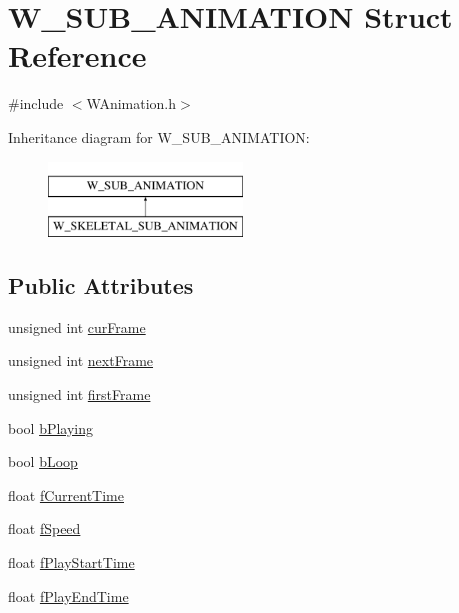 \hypertarget{struct_w___s_u_b___a_n_i_m_a_t_i_o_n}{}\section{W\+\_\+\+S\+U\+B\+\_\+\+A\+N\+I\+M\+A\+T\+I\+ON Struct Reference}
\label{struct_w___s_u_b___a_n_i_m_a_t_i_o_n}


{\ttfamily \#include $<$W\+Animation.\+h$>$}

Inheritance diagram for W\+\_\+\+S\+U\+B\+\_\+\+A\+N\+I\+M\+A\+T\+I\+ON\+:\begin{figure}[H]
\begin{center}
\leavevmode
\includegraphics[height=2.000000cm]{struct_w___s_u_b___a_n_i_m_a_t_i_o_n}
\end{center}
\end{figure}
\subsection*{Public Attributes}
\begin{DoxyCompactItemize}
\item 
unsigned int \hyperlink{struct_w___s_u_b___a_n_i_m_a_t_i_o_n_a6eaba4aaaf7dad81d0259fdfb5b0ee84}{cur\+Frame}
\item 
unsigned int \hyperlink{struct_w___s_u_b___a_n_i_m_a_t_i_o_n_a4c308bafa17ea951fcf4486caf9f45b8}{next\+Frame}
\item 
unsigned int \hyperlink{struct_w___s_u_b___a_n_i_m_a_t_i_o_n_a32f726d022afd30cff9b7cae9259cafa}{first\+Frame}
\item 
bool \hyperlink{struct_w___s_u_b___a_n_i_m_a_t_i_o_n_a8cf7c188213a51cd0bf3a2bb18add32b}{b\+Playing}
\item 
bool \hyperlink{struct_w___s_u_b___a_n_i_m_a_t_i_o_n_ae3af9aac28fa44b1c27f8834fa47371d}{b\+Loop}
\item 
float \hyperlink{struct_w___s_u_b___a_n_i_m_a_t_i_o_n_ae6866df11b272a2a1928d54165ef2824}{f\+Current\+Time}
\item 
float \hyperlink{struct_w___s_u_b___a_n_i_m_a_t_i_o_n_a5f1a892565c32d4d6da2a98d209ce2a5}{f\+Speed}
\item 
float \hyperlink{struct_w___s_u_b___a_n_i_m_a_t_i_o_n_a34791417cc32bb2ddbe3f9d421e74d2d}{f\+Play\+Start\+Time}
\item 
float \hyperlink{struct_w___s_u_b___a_n_i_m_a_t_i_o_n_aab134456793deb3cd3b1f0689f3617ef}{f\+Play\+End\+Time}
\end{DoxyCompactItemize}


